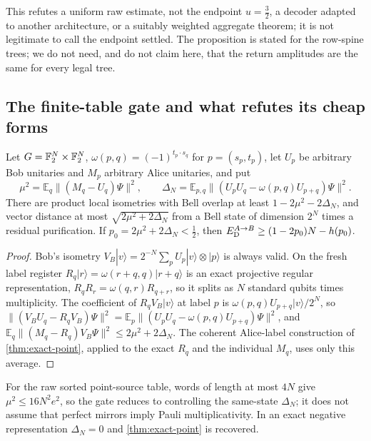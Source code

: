 This refutes a uniform raw estimate, not the endpoint $u=\frac32$, a decoder adapted to another architecture, or a suitably weighted
aggregate theorem; it is not legitimate to call the endpoint settled. The proposition is stated for the row-spine trees; we do not
need, and do not claim here, that the return amplitudes are the same for every legal tree.

\subsection{The finite-table gate and what refutes its cheap forms}\label{sec:table}

\begin{proposition}\label{prop:table}
Let $G=\mathbb F_2^N\times\mathbb F_2^N$, $\omega(p,q)=(-1)^{t_p\cdot s_q}$ for $p=(s_p,t_p)$, let $U_p$ be arbitrary Bob unitaries and $M_p$ arbitrary
Alice unitaries, and put
\[
\mu^2=\mathbb E_q\|(M_q-U_q)\Psi\|^2,\qquad\Delta_N=\mathbb E_{p,q}\|(U_pU_q-\omega(p,q)U_{p+q})\Psi\|^2 .
\]
There are product local isometries with Bell overlap at least $1-2\mu^2-2\Delta_N$, and vector distance at most
$\sqrt{2\mu^2+2\Delta_N}$ from a Bell state of dimension $2^N$ times a residual purification. If $p_0=2\mu^2+2\Delta_N<\frac12$, then
$E_{\mathrm D}^{A\to B}\ge(1-2p_0)N-h(p_0)$.
\end{proposition}

\begin{proof}
Bob's isometry $V_B|v\rangle=2^{-N}\sum_pU_p|v\rangle\otimes|p\rangle$ is always valid. On the fresh label register
$R_q|r\rangle=\omega(r+q,q)|r+q\rangle$ is an exact projective regular representation, $R_qR_r=\omega(q,r)R_{q+r}$, so it splits as $N$ standard
qubits times multiplicity. The coefficient of $R_qV_B|v\rangle$ at label $p$ is $\omega(p,q)U_{p+q}|v\rangle/2^N$, so
$\|(V_BU_q-R_qV_B)\Psi\|^2=\mathbb E_p\|(U_pU_q-\omega(p,q)U_{p+q})\Psi\|^2$, and $\mathbb E_q\|(M_q-R_q)V_B\Psi\|^2\le2\mu^2+2\Delta_N$. The coherent Alice-label
construction of \cref{thm:exact-point}, applied to the exact $R_q$ and the individual $M_q$, uses only this average.
\end{proof}

For the raw sorted point-source table, words of length at most $4N$ give $\mu^2\le16N^2e^2$, so the gate reduces to controlling the
same-state $\Delta_N$; it does not assume that perfect mirrors imply Pauli multiplicativity. In an exact negative representation
$\Delta_N=0$ and \cref{thm:exact-point} is recovered.

